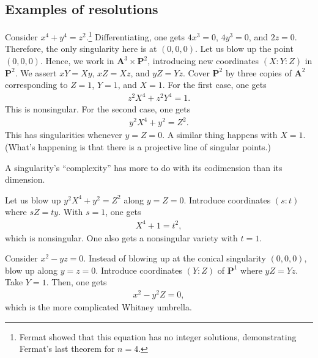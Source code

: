 \documentclass[11pt, oneside,margin=1in]{article}
\begin{document}
\subsection{Examples of resolutions}
\begin{example}[ ]\label{}\text{}
Consider $x^4+y^4=z^2$.\footnote{Fermat showed that this equation has no integer solutions, demonstrating Fermat's last theorem for $n=4$.} Differentiating, one gets $4x^3=0$, $4y^3=0$, and $2z=0$. Therefore, the only singularity here is at $(0,0,0)$. Let us blow up the point $(0,0,0)$. Hence, we work in $\mathbf{A}^3\times \mathbf{P}^2$, introducing new coordinates $(X:Y:Z)$ in $\mathbf{P}^2$. We assert $xY=Xy$, $xZ=Xz$, and $yZ=Yz$. Cover $\mathbf{P}^2$ by three copies of $\mathbf{A}^2$ corresponding to $Z=1$, $Y=1$, and $X=1$. For the first case, one gets 
\begin{align*}
	z^2X^4+z^2Y^4=1.
\end{align*}
This is nonsingular. For the second case, one gets
\begin{align*}
	y^2X^4+y^2=Z^2.
\end{align*}
This has singularities whenever $y=Z=0$. A similar thing happens with $X=1$. (What's happening is that there is a projective line of singular points.)

\begin{remark}
	A singularity's ``complexity'' has more to do with its codimension than its dimension.
\end{remark}

Let us blow up $y^2X^4+y^2=Z^2$ along $y=Z=0$. Introduce coordinates $(s:t)$ where $sZ=ty$. With $s=1$, one gets 
\begin{align*}
	X^4 + 1=t^2,
\end{align*}
which is nonsingular. One also gets a nonsingular variety with $t=1$.
\end{example}


\begin{example}\label{}\text{}
Consider $x^2-yz=0$. Instead of blowing up at the conical singularity $(0,0,0)$, blow up along $y=z=0$. Introduce coordinates $(Y:Z)$ of $\mathbf{P}^1$ where $yZ=Yz$. Take $Y=1$. Then, one gets
\begin{align*}
	x^2-y^2Z=0,
\end{align*}
which is the more complicated Whitney umbrella.
\end{example}
\end{document}
